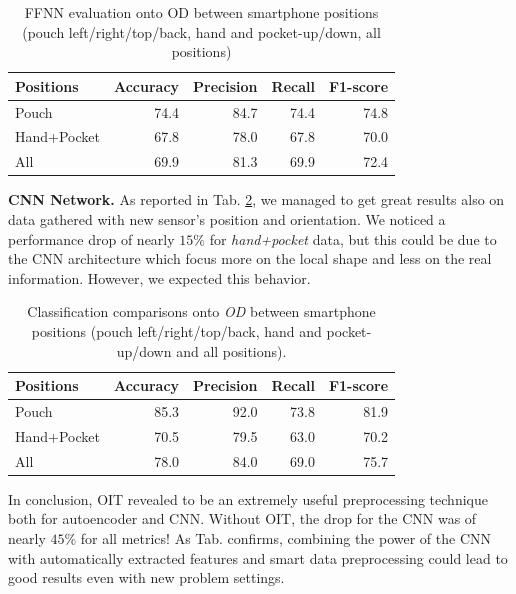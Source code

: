 \begin{table}[h]
  \centering
  \begin{tabular}{lrrrr}
    \hline
    Positions & Accuracy & Precision & Recall & F1-score \\
    \hline
    Pouch & 74.4 & 84.7 & 74.4 & 74.8 \\
    Hand+Pocket & 67.8 & 78.0 & 67.8 & 70.0 \\
    All & 69.9 & 81.3 & 69.9 & 72.4 \\
    \hline
  \end{tabular}
  \caption{FFNN evaluation onto OD between smartphone positions (pouch
    left/right/top/back, hand and pocket-up/down, all positions)}
  \label{tab:ffnn-metrics}
\end{table}

\textbf{CNN Network.}  As reported in
Tab. \ref{tab:model-oit-performance}, we managed to get great results
also on data gathered with new sensor's position and orientation. We
noticed a performance drop of nearly $15\%$ for \textit{hand+pocket}
data, but this could be due to the CNN architecture which focus more
on the local shape and less on the real information. However, we
expected this behavior. 

\begin{table}[h]
  \begin{center}
    \begin{tabular}{p{1.8cm}rrrr}
      \hline
      Positions & Accuracy & Precision & Recall & F1-score \\
      \hline
      Pouch & 85.3 & 92.0 & 73.8 & 81.9 \\
      Hand+Pocket & 70.5 & 79.5 & 63.0 & 70.2 \\
      All & 78.0 & 84.0 & 69.0 & 75.7 \\
      \hline
    \end{tabular}
    \caption{Classification comparisons onto \textit{OD} between
      smartphone positions (pouch left/right/top/back, hand and
      pocket-up/down and all positions).}
    \label{tab:model-oit-performance}
  \end{center}
\end{table}

In conclusion, OIT revealed to be an extremely useful preprocessing
technique both for autoencoder and CNN. Without OIT, the drop for the
CNN was of nearly $45$\% for all metrics!  As Tab. confirms, combining
the power of the CNN with automatically extracted features and smart
data preprocessing could lead to good results even with new problem
settings.


